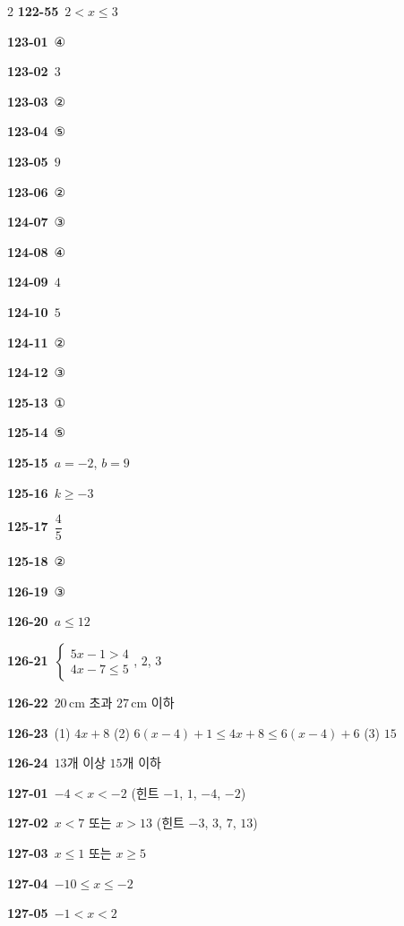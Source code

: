 \documentclass[10pt,a4paper]{article}
\begin{document}
\begin{multicols}{2}
\noindent\textbf{122-55}\ $2<x\le 3$\par
\noindent\textbf{123-01}\ ④\par
\noindent\textbf{123-02}\ $3$\par
\noindent\textbf{123-03}\ ②\par
\noindent\textbf{123-04}\ ⑤\par
\noindent\textbf{123-05}\ $9$\par
\noindent\textbf{123-06}\ ②\par
\noindent\textbf{124-07}\ ③\par
\noindent\textbf{124-08}\ ④\par
\noindent\textbf{124-09}\ $4$\par
\noindent\textbf{124-10}\ $5$\par
\noindent\textbf{124-11}\ ②\par
\noindent\textbf{124-12}\ ③\par
\noindent\textbf{125-13}\ ①\par
\noindent\textbf{125-14}\ ⑤\par
\noindent\textbf{125-15}\ $a=-2$, $b=9$\par
\noindent\textbf{125-16}\ $k\ge -3$\par
\noindent\textbf{125-17}\ $\dfrac{4}{5}$\par
\noindent\textbf{125-18}\ ②\par
\noindent\textbf{126-19}\ ③\par
\noindent\textbf{126-20}\ $a\le 12$\par
\noindent\textbf{126-21}\ $\begin{cases} 5x-1>4 \\ 4x-7\le 5 \end{cases}$, $2$, $3$\par
\noindent\textbf{126-22}\ $20\,\mathrm{cm}$ 초과 $27\,\mathrm{cm}$ 이하\par
\noindent\textbf{126-23}\ (1) $4x+8$ (2) $6(x-4)+1\le 4x+8\le 6(x-4)+6$ (3) $15$\par
\noindent\textbf{126-24}\ $13$개 이상 $15$개 이하\par
\noindent\textbf{127-01}\ $-4<x<-2$ (힌트 $-1$, $1$, $-4$, $-2$)\par
\noindent\textbf{127-02}\ $x<7$ 또는 $x>13$ (힌트 $-3$, $3$, $7$, $13$)\par
\noindent\textbf{127-03}\ $x\le 1$ 또는 $x\ge 5$\par
\noindent\textbf{127-04}\ $-10\le x\le -2$\par
\noindent\textbf{127-05}\ $-1<x<2$\par

\end{multicols}
\end{document}
